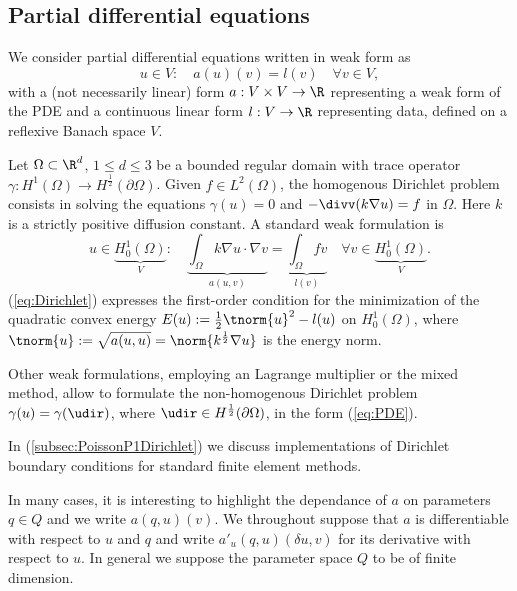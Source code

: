 \subsection{Partial differential equations}\label{subsec:}
%
We consider partial differential equations written in weak form as
%
\begin{equation}\label{eq:PDE}
u\in V:\quad a(u)(v) = l(v)\quad\forall v\in V,
\end{equation}
%
with a (not necessarily linear) form $a:V\times V\to\R$ representing a weak form of the PDE and a continuous linear form $l:V\to\R$ representing data, defined on a reflexive Banach space $V$.
%
\begin{example}[label=example:Poisson]
Let $\Omega\subset\R^d$, $1\le d\le 3$ be a bounded regular domain with trace operator $\gamma:H^1(\Omega)\to H^{\frac12}(\partial\Omega)$. Given $f\in L^2(\Omega)$, the homogenous Dirichlet problem consists in 
solving the equations $\gamma(u) = 0$ and $-\divv( k\nabla u) = f$ in $\Omega$. Here $k$ is a strictly positive diffusion constant. 
A standard weak formulation is
%
\begin{equation}\label{eq:Poisson}
u\in\underbrace{H^1_0(\Omega)}_{V}:\quad \underbrace{\int_{\Omega}k\nabla u\cdot \nabla v}_{a(u,v)} = \underbrace{\int_{\Omega} fv}_{l(v)} \quad\forall v\in  \underbrace{H^1_0(\Omega)}_{V}.
\end{equation}
%
(\ref{eq:Dirichlet}) expresses the first-order condition for the minimization of the quadratic convex energy $E(u):= \frac12\tnorm{u}^2 - l(u)$ on $H^1_0(\Omega)$, where 
$\tnorm{u} := \sqrt{a(u,u)} = \norm{k^{\frac12}\nabla u}$ is the energy norm.

Other weak formulations, employing an Lagrange multiplier or the mixed method, allow to formulate 
the non-homogenous Dirichlet problem $\gamma(u) = \gamma(\udir)$, where $\udir\in H^{\frac12}(\partial\Omega)$, in the form (\ref{eq:PDE}).

In (\ref{subsec:PoissonP1Dirichlet}) we discuss implementations of Dirichlet boundary conditions for standard finite element methods.
\end{example}
%

In many cases, it is interesting to highlight the dependance of 
$a$ on parameters $q\in Q$ and we write $a(q,u)(v)$. We throughout suppose that $a$ is differentiable with respect to $u$ and $q$ and write $a'_u(q,u)(\delta u, v)$ for its derivative with respect to $u$. 
In general we suppose the parameter space $Q$ to be of finite dimension.

